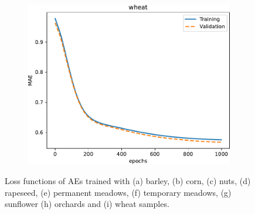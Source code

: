 \documentclass[journal,article,submit,pdftex,moreauthors]{Definitions/mdpi}
\begin{document}
\begin{figure}[H]
\begin{subfigure}[t]{0.3\textwidth}
		\includegraphics[width=\linewidth]{figures/results_040923/loss_wheat.pdf}
	\caption{}
	\label{fig:loss_wheat}
	\end{subfigure}
	\caption{Loss functions of AEs trained with (a) barley, (b) corn, (c) nuts, (d) rapeseed, (e) permanent meadows, (f) temporary meadows, (g) sunflower (h) orchards and (i) wheat samples.}
	\label{loss_fuctions}
\end{figure}
\end{document}
